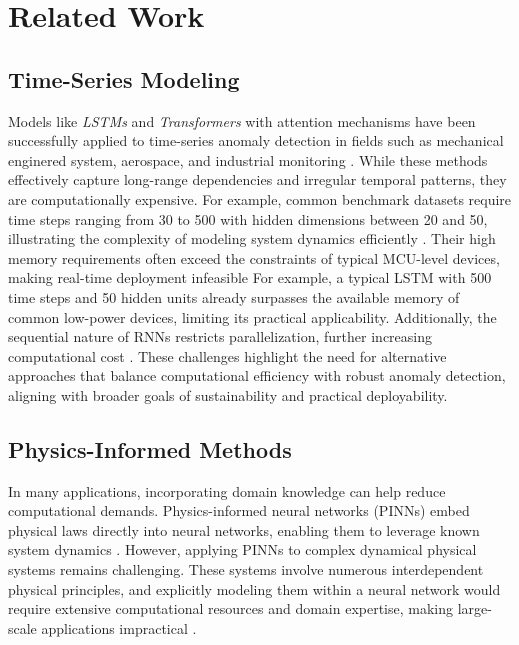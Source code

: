 \section{Related Work}
\subsection{Time-Series Modeling}
Models like \textit{LSTMs} and \textit{Transformers} with attention mechanisms have been successfully applied to time-series anomaly detection in fields such as mechanical enginered system, aerospace, and industrial monitoring \cite{lachekhab_lstm-autoencoder_2024,liu_deep_2023,wei_lstm-autoencoder-based_2023}. While these methods effectively capture long-range dependencies and irregular temporal patterns, they are computationally expensive. For example, common benchmark datasets require time steps ranging from 30 to 500 with hidden dimensions between 20 and 50, illustrating the complexity of modeling system dynamics efficiently \cite{mahmoud_ae-lstm_2022}. Their high memory requirements often exceed the constraints of typical MCU-level devices, making real-time deployment infeasible For example, a typical LSTM with 500 time steps and 50 hidden units already surpasses the available memory of common low-power devices, limiting its practical applicability. Additionally, the sequential nature of RNNs restricts parallelization, further increasing computational cost \cite{rezk_recurrent_2020}. These challenges highlight the need for alternative approaches that balance computational efficiency with robust anomaly detection, aligning with broader goals of sustainability and practical deployability. \par
\subsection{Physics-Informed Methods}
In many applications, incorporating domain knowledge can help reduce computational demands. Physics-informed neural networks (PINNs) embed physical laws directly into neural networks, enabling them to leverage known system dynamics \cite{cai_physics-informed_2021,raissi_physics-informed_2019,raissi_hidden_2020}. However, applying PINNs to complex dynamical physical systems remains challenging. These systems involve numerous interdependent physical principles, and explicitly modeling them within a neural network would require extensive computational resources and domain expertise, making large-scale applications impractical \cite{karniadakis_physics-informed_2021,wang_when_2022}.

